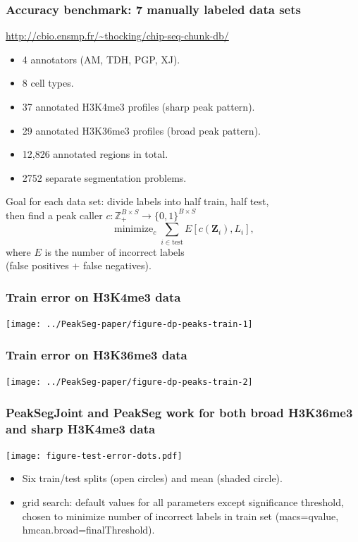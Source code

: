 \documentclass{beamer}
\DeclareMathOperator*{\minimize}{minimize}
\newcommand{\ZZ}{\mathbb Z}
\begin{document}
\begin{frame}
  \frametitle{Accuracy benchmark: 7 manually labeled data sets}
  \url{http://cbio.ensmp.fr/~thocking/chip-seq-chunk-db/}
  \begin{itemize}
  \item 4 annotators (AM, TDH, PGP, XJ).
  \item 8 cell types.
  \item 37 annotated H3K4me3 profiles (sharp peak pattern).
  \item 29 annotated H3K36me3 profiles (broad peak pattern).
  \item 12,826 annotated regions in total.
  \item 2752 separate segmentation problems.
  \end{itemize}
  Goal for each data set: divide labels into half train, half test,\\
  then find a peak caller $c:\ZZ_+^{B\times S} \rightarrow
  \{0,1\}^{B\times S}$
  \begin{equation*}
    \minimize_c \sum_{i\in\text{test}} E[c(\mathbf Z_i),  L_i],
  \end{equation*}
  where $E$ is the number of incorrect labels\\(false positives + false
  negatives).
\end{frame}

\begin{frame}
  \frametitle{Train error on H3K4me3 data}
  \texttt{[image: ../PeakSeg-paper/figure-dp-peaks-train-1]}
\end{frame}

\begin{frame}
  \frametitle{Train error on H3K36me3 data}
  \texttt{[image: ../PeakSeg-paper/figure-dp-peaks-train-2]}
\end{frame}

\begin{frame}
  \frametitle{PeakSegJoint and PeakSeg work
 for both broad H3K36me3
    and sharp H3K4me3 data}

  \texttt{[image: figure-test-error-dots.pdf]}

  \begin{itemize}
  \item Six train/test splits (open circles) and mean (shaded circle).
  \item grid search: default values for all parameters except
    significance threshold, chosen to minimize number of incorrect
    labels in train set (macs=qvalue, hmcan.broad=finalThreshold).
  \end{itemize}
\end{frame}
\end{document}

